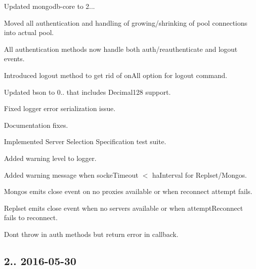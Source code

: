 \begin{DoxyItemize}
\item Updated mongodb-\/core to 2...
\item Moved all authentication and handling of growing/shrinking of pool connections into actual pool.
\item All authentication methods now handle both auth/reauthenticate and logout events.
\item Introduced logout method to get rid of on\+All option for logout command.
\item Updated bson to 0.. that includes Decimal128 support.
\item Fixed logger error serialization issue.
\item Documentation fixes.
\item Implemented Server Selection Specification test suite.
\item Added warning level to logger.
\item Added warning message when socke\+Timeout $<$ ha\+Interval for Replset/\+Mongos.
\item Mongos emits close event on no proxies available or when reconnect attempt fails.
\item Replset emits close event when no servers available or when attempt\+Reconnect fails to reconnect.
\item Don\textquotesingle{}t throw in auth methods but return error in callback.
\end{DoxyItemize}

\subsection*{2.. 2016-\/05-\/30 }


